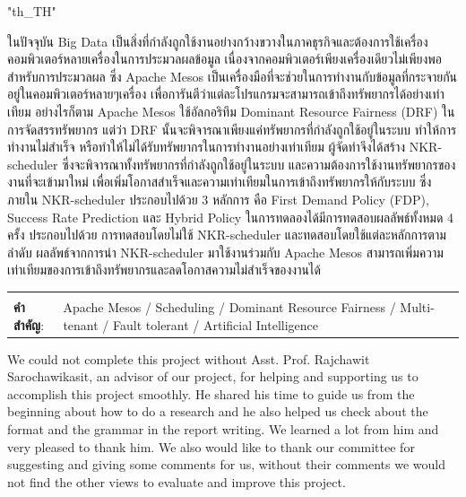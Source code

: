 \documentclass[12pt,oneside,openright,a4paper]{cpe-english-project}
\begin{document}
{
\XeTeXlinebreaklocale "th_TH"	
\thaifont
\thaiabstract

\hspace{10mm}ในปัจจุบัน Big Data เป็นสิ่งที่กำลังถูกใช้งานอย่างกว้างขวางในภาคธุรกิจและต้องการใช้เครื่องคอมพิวเตอร์หลายเครื่องในการประมวลผลข้อมูล เนื่องจากคอมพิวเตอร์เพียงเครื่องเดียวไม่เพียงพอสำหรับการประมวลผล ซึ่ง Apache Mesos เป็นเครื่องมือที่จะช่วยในการทำงานกับข้อมูลที่กระจายกันอยู่ในคอมพิวเตอร์หลายๆเครื่อง เพื่อการันตีว่าแต่ละโปรแกรมจะสามารถเข้าถึงทรัพยากรได้อย่างเท่าเทียม อย่างไรก็ตาม Apache Mesos ใช้อัลกอริทึม Dominant Resource Fairness (DRF) ในการจัดสรรทรัพยากร แต่ว่า DRF นั้นจะพิจารณาเพียงแค่ทรัพยากรที่กำลังถูกใช้อยู่ในระบบ ทำให้การทำงานไม่สำเร็จ หรือทำให้ไม่ได้รับทรัพยากรในการทำงานอย่างเท่าเทียม ผู้จัดทำจึงได้สร้าง NKR-scheduler ซึ่งจะพิจารณาทั้งทรัพยากรที่กำลังถูกใช้อยู่ในระบบ และความต้องการใช้งานทรัพยากรของงานที่จะเข้ามาใหม่ เพื่อเพิ่มโอกาสสำเร็จและความเท่าเทียมในการเข้าถึงทรัพยากรให้กับระบบ ซึ่งภายใน NKR-scheduler ประกอบไปด้วย 3 หลักการ คือ First Demand Policy (FDP), Success Rate Prediction และ Hybrid Policy ในการทดลองได้มีการทดสอบผลลัพธ์ทั้งหมด 4 ครั้ง ประกอบไปด้วย การทดสอบโดยไม่ใช้  NKR-scheduler และทดสอบโดยใช้แต่ละหลักการตามลำดับ ผลลัพธ์จากการนำ NKR-scheduler มาใช้งานร่วมกับ Apache Mesos สามารถเพิ่มความเท่าเทียมของการเข้าถึงทรัพยากรและลดโอกาสความไม่สำเร็จของงานได้

\begin{flushleft}
\begin{tabular*}{\textwidth}{@{}lp{}}
 & \\

\textbf{คำสำคัญ}: & Apache Mesos / Scheduling / Dominant Resource Fairness / Multi-tenant / Fault tolerant / Artificial Intelligence 
\end{tabular*}
\end{flushleft}
\endabstract
}

\preface
\hspace{10mm}We could not complete this project without Asst. Prof. Rajchawit Sarochawikasit, an advisor of our project, for helping and supporting us to accomplish this project smoothly. He shared his time to guide us from the beginning about how to do a research and he also helped us check about the format and the grammar in the report writing. We learned a lot from him and very pleased to thank him. We also would like to thank our committee for suggesting and giving some comments for us, without their comments we would not find the other views to evaluate and improve this project. 
\end{document}
